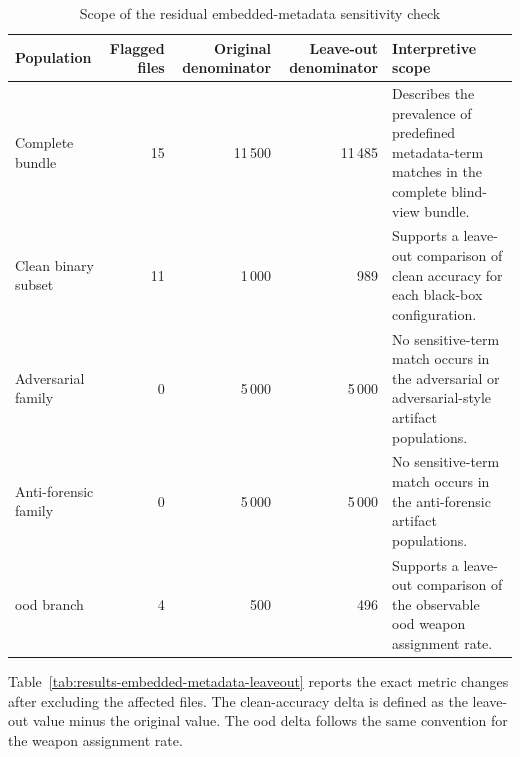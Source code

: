 \begin{table}[H]
\centering
\scriptsize
\renewcommand{\arraystretch}{1.15}
\setlength{\tabcolsep}{4pt}
\caption{Scope of the residual embedded-metadata sensitivity check}
\label{tab:results-embedded-metadata-scope}
\begin{tabularx}{\textwidth}{@{}p{} r r r X@{}}
\toprule
\textbf{Population} &
\textbf{Flagged files} &
\textbf{Original denominator} &
\textbf{Leave-out denominator} &
\textbf{Interpretive scope} \\
\midrule

Complete bundle
& 15
& 11\,500
& 11\,485
& Describes the prevalence of predefined metadata-term matches in the complete
blind-view bundle. \\

Clean binary subset
& 11
& 1\,000
& 989
& Supports a leave-out comparison of clean accuracy for each black-box
configuration. \\

Adversarial family
& 0
& 5\,000
& 5\,000
& No sensitive-term match occurs in the adversarial or adversarial-style
artifact populations. \\

Anti-forensic family
& 0
& 5\,000
& 5\,000
& No sensitive-term match occurs in the anti-forensic artifact populations. \\

\gls{ood} branch
& 4
& 500
& 496
& Supports a leave-out comparison of the observable \gls{ood} weapon assignment
rate. \\

\bottomrule
\end{tabularx}
\end{table}

Table~\ref{tab:results-embedded-metadata-leaveout} reports the exact metric
changes after excluding the affected files. The clean-accuracy delta is defined
as the leave-out value minus the original value. The \gls{ood} delta follows the
same convention for the weapon assignment rate.

